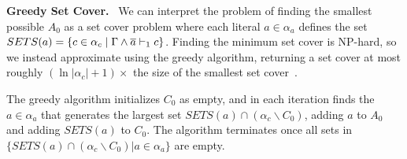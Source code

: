 
%


\noindent \textbf{Greedy Set Cover.}~\label{subsec:sym} %
We can interpret the problem of finding the smallest possible $A_0$ as a set cover problem 
where each literal $a \in \alpha_a$ defines the set  $SETS(a) = \{ c \in \alpha_c \; | \; \Gamma \land \overline{a} \vdash_1 c\}$.
Finding the minimum set cover is NP-hard, so we instead approximate using the greedy algorithm, returning a set cover at most roughly $(\ln |\alpha_c| + 1)\times$ the size of the smallest set cover~\cite{greedysetcover}. 




The greedy algorithm initializes $C_0$ as empty, and in each iteration finds the $a \in \alpha_a$ that generates the largest set $SETS(a) \cap (\alpha_c \backslash C_0)$, adding $a$ to $A_0$ and adding $SETS(a)$ to $C_0$.
The algorithm terminates once all sets in $\{SETS(a) \cap (\alpha_c \backslash C_0) | a \in \alpha_a \}$ are empty.


